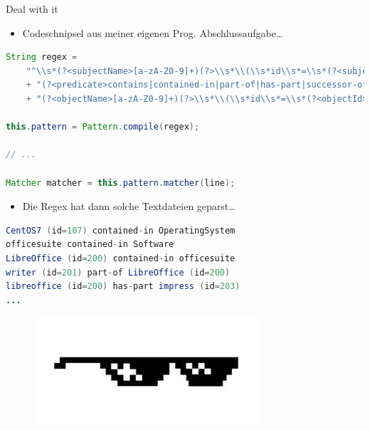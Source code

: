 \documentclass[18pt]{beamer}
\begin{document}
\begin{frame}[fragile]{Deal with it}
    \begin{itemize}
        \item Codeschnipsel aus meiner eigenen Prog. Abschlussaufgabe\dots
    \end{itemize}
    \begin{lstlisting}[language=Java,basicstyle=\tiny]
String regex =
    "^\\s*(?<subjectName>[a-zA-Z0-9]+)(?>\\s*\\(\\s*id\\s*=\\s*(?<subjectId>[0-9]+)\\s*\\))?\\s+"
    + "(?<predicate>contains|contained-in|part-of|has-part|successor-of|predecessor-of)\\s+"
    + "(?<objectName>[a-zA-Z0-9]+)(?>\\s*\\(\\s*id\\s*=\\s*(?<objectId>[0-9]+)\\s*\\))?\\s*$";

this.pattern = Pattern.compile(regex);

// ...

Matcher matcher = this.pattern.matcher(line);
    \end{lstlisting}

\begin{itemize}
    \item Die Regex hat dann solche Textdateien geparst\dots
\end{itemize}

    \begin{lstlisting}[language=Java,basicstyle=\tiny]
CentOS7 (id=107) contained-in OperatingSystem
officesuite contained-in Software
LibreOffice (id=200) contained-in officesuite
writer (id=201) part-of LibreOffice (id=200)
libreoffice (id=200) has-part impress (id=203)
...
    \end{lstlisting}


    \begin{figure}
        \includegraphics[scale=.2]{img/dealwithit.jpg}
    \end{figure}

\end{frame}
\end{document}
